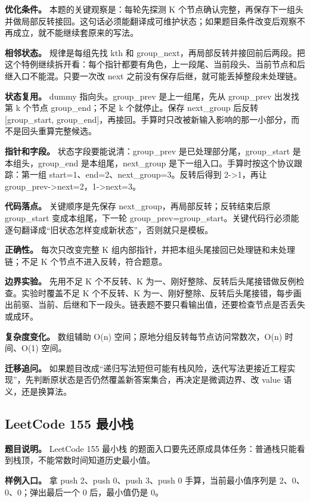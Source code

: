 \textbf{优化条件。} 本题的关键观察是：每轮先探测 K 个节点确认完整，再保存下一组头并做局部反转接回。这句话必须能翻译成可维护状态；如果题目条件改变后观察不再成立，就不能继续套原来的写法。

\textbf{相邻状态。} 规律是每组先找 kth 和 group\_next，再局部反转并接回前后两段。把这个特例继续拆开看：每个指针都要有角色，上一段尾、当前段头、当前节点和后继入口不能混。只要一次改 next 之前没有保存后继，就可能丢掉整段未处理链。

\textbf{状态复用。} dummy 指向头。group\_prev 是上一组尾，先从 group\_prev 出发找第 k 个节点 group\_end；不足 k 个就停止。保存 next\_group 后反转 [group\_start, group\_end]，再接回。手算时只改被新输入影响的那一小部分，而不是回头重算完整候选。

\textbf{指针和字段。} 状态字段要能说清：group\_prev 是已处理部分尾，group\_start 是本组头，group\_end 是本组尾，next\_group 是下一组入口。手算时按这个协议跟踪：第一组 start=1、end=2、next\_group=3。反转后得到 2->1，再让 group\_prev->next=2，1->next=3。

\textbf{代码落点。} 关键顺序是先保存 next\_group，再局部反转；反转结束后原 group\_start 变成本组尾，下一轮 group\_prev=group\_start。关键代码行必须能逐句翻译成“旧状态怎样变成新状态”，否则就只是模板。

\textbf{正确性。} 每次只改变完整 K 组内部指针，并把本组头尾接回已处理链和未处理链；不足 K 个节点不进入反转，符合题意。

\textbf{边界实验。} 先用不足 K 个不反转、K 为一、刚好整除、反转后头尾接错做反例检查。实验时覆盖不足 K 个不反转、K 为一、刚好整除、反转后头尾接错，每步画出前驱、当前、后继和下一段头。链表题不要只看输出值，还要检查节点是否丢失或成环。

\textbf{复杂度变化。} 数组辅助 O(n) 空间；原地分组反转每节点访问常数次，O(n) 时间、O(1) 空间。

\textbf{迁移追问。} 如果题目改成“递归写法短但可能有栈风险，迭代写法更接近工程实现”，先判断原状态是否仍然覆盖新答案集合，再决定是微调边界、改 value 语义，还是换算法。

\subsection{LeetCode 155 最小栈}

\textbf{题目说明。} LeetCode 155 最小栈 的题面入口要先还原成具体任务：普通栈只能看到栈顶，不能常数时间知道历史最小值。

\textbf{样例入口。} 拿 push 2、push 0、push 3、push 0 手算，当前最小值序列是 2、0、0、0；弹出最后一个 0 后，最小值仍是 0。

